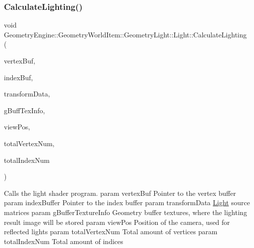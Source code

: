 \mbox{\label{class_geometry_engine_1_1_geometry_world_item_1_1_geometry_light_1_1_light_a4a133e49941a68ac8c33f757e687c8b7}} 
\subsubsection{\texorpdfstring{CalculateLighting()}{CalculateLighting()}}
{\footnotesize\ttfamily void Geometry\+Engine\+::\+Geometry\+World\+Item\+::\+Geometry\+Light\+::\+Light\+::\+Calculate\+Lighting (\begin{DoxyParamCaption}\item[{Q\+Open\+G\+L\+Buffer $\ast$}]{vertex\+Buf,  }\item[{Q\+Open\+G\+L\+Buffer $\ast$}]{index\+Buf,  }\item[{const \mbox{\hyperlink{struct_geometry_engine_1_1_lighting_transformation_data}{Lighting\+Transformation\+Data}} \&}]{transform\+Data,  }\item[{const \mbox{\hyperlink{struct_geometry_engine_1_1_g_buffer_texture_info}{G\+Buffer\+Texture\+Info}} \&}]{g\+Buff\+Tex\+Info,  }\item[{const Q\+Vector3D \&}]{view\+Pos,  }\item[{unsigned int}]{total\+Vertex\+Num,  }\item[{unsigned int}]{total\+Index\+Num }\end{DoxyParamCaption})\hspace{0.3cm}{\ttfamily [virtual]}}

Calls the light shader program. param vertex\+Buf Pointer to the vertex buffer param index\+Buffer Pointer to the index buffer param transform\+Data \mbox{\hyperlink{class_geometry_engine_1_1_geometry_world_item_1_1_geometry_light_1_1_light}{Light}} source matrices param g\+Buffer\+Texture\+Info Geometry buffer textures, where the lighting result image will be stored param view\+Pos Position of the camera, used for reflected lights param total\+Vertex\+Num Total amount of vertices param total\+Index\+Num Total amount of indices \mbox{\label{class_geometry_engine_1_1_geometry_world_item_1_1_geometry_light_1_1_light_ae50fab4782158671041ac986dfead7fc}} 
